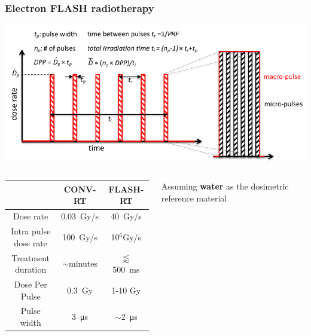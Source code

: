     \begin{frame}
        \frametitle{Electron FLASH radiotherapy}
        \centering
        \bigskip
        \includegraphics[width=.9\linewidth]{figures/test_beam/beam_structure.pdf}
        \begin{columns}
                \begin{table}
                    \footnotesize
                    \begin{center}
                    \begin{tabular}{|c | c |c |}
                    \hline
                    & CONV-RT & FLASH-RT \\
                    \hline
                    \hline
                    Dose rate & \SI{0.03}{Gy/s} & \SI{40}{Gy/s}\\
                    Intra pulse dose rate & \SI{100}{Gy/s}& 10$^6$\si{Gy/s}\\
                    Treatment duration & $\sim$minutes & $\lessapprox$\SI{500}{ms} \\
                    Dose Per Pulse & \SI{0.3}{Gy} & 1-10 Gy\\
                    Pulse width & \SI{3}{\us} & $\sim$\SI{2}{\us} \\
                    \hline
                    \end{tabular}
                    \end{center}
                \end{table} 
                
                Assuming \textbf{water} as the dosimetric reference material 
        \end{columns}
    \end{frame}     



